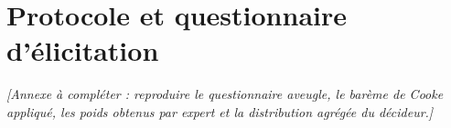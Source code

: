 \chapter{Protocole et questionnaire d'élicitation}
\label{ann:elicitation}

\textit{[Annexe à compléter : reproduire le questionnaire aveugle, le barème de Cooke
appliqué, les poids obtenus par expert et la distribution agrégée du décideur.]}

%
